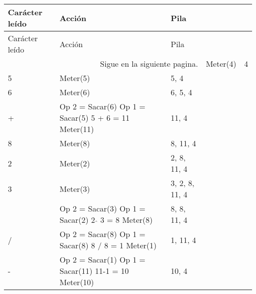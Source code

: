 \documentclass[12pt ]{article}
\begin{document}
 \begin{longtable}[h]{p{4cm} p{4cm} p{4cm}}

        \hline

        \rowcolor{LightBlue2} Carácter leído &Acción& Pila  \\
        \hline\hline
        \endfirsthead

        \hline
        \rowcolor{LightBlue2} Carácter leído &Acción& Pila \\
        \hline\hline
        \endhead

        \multicolumn{3}{r}{Sigue en la siguiente pagina.}
        \endfoot

        \endlastfoot

	4 & Meter(4) & 4 \\
        \rowcolor{gray!20}5 &Meter(5)&5, 4 \\


        6 & Meter(6) & 6, 5, 4 \\
        \rowcolor{gray!20}  + &Op 2 = Sacar(6)\hspace{1 cm} Op 1 = Sacar(5) \hspace{1 cm} 5 + 6 = 11 \hspace{2 cm} Meter(11) &11, 4 \\


        8 & Meter(8) & 8, 11, 4 \\
        \rowcolor{gray!20}2 &Meter(2)&2, 8, 11, 4 \\

        3 & Meter(3) & 3, 2, 8, 11, 4 \\
        \rowcolor{gray!20}  $\hat{{}}$ &Op 2 = Sacar(3)\hspace{2 cm} Op 1 = Sacar(2) \hspace{3 cm} 2 $\hat{{}}$ 3 = 8 \hspace{2 cm} Meter(8) &8,  8, 11, 4\\

          / &Op 2 = Sacar(8)\hspace{2 cm} Op 1 = Sacar(8) \hspace{3 cm} 8 / 8 = 1 \hspace{2 cm} Meter(1) &1, 11, 4\\


          \rowcolor{gray!20}  - &Op 2 = Sacar(1)\hspace{2 cm} Op 1 = Sacar(11) \hspace{3 cm}  11-1 = 10 \hspace{2 cm} Meter(10) & 10, 4\\



\end{longtable}
\end{document}
